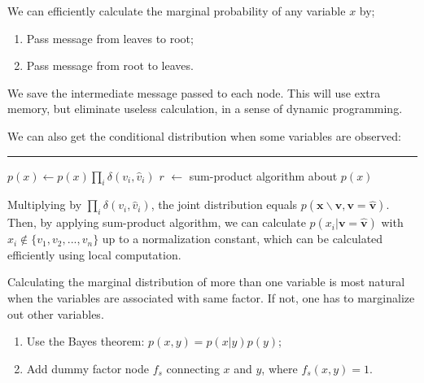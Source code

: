 \documentclass{article}
\begin{document}
        We can efficiently calculate the marginal probability of any variable $x$
        by;
        \begin{enumerate}
            \item Pass message from leaves to root;
            \item Pass message from root to leaves.
        \end{enumerate}
        We save the intermediate message passed to each node. This will use extra memory, but
        eliminate useless calculation, in a sense of dynamic programming.
        
        We can also get the conditional distribution when some variables are observed:
        
        \begin{algorithm}[H]
            \DontPrintSemicolon

            \caption{Modified sum-product algorithm for conditional distributions}


            \BlankLine
            \hrule

            $p(x) \leftarrow p(x)\prod_i \delta(v_i, \hat{v}_i)$\;
            $r$ $\leftarrow$ sum-product algorithm about $p(x)$\;

        \end{algorithm}

        Multiplying by $\prod_{i} \delta(v_i, \hat{v}_i)$, the joint distribution equals
        $p(\textbf{x} \backslash \textbf{v}, \textbf{v} = \hat{\textbf{v}})$.
        Then, by applying sum-product algorithm, we can calculate $p(x_i|\textbf{v}=\hat{\textbf{v}})$ with $x_i \notin \{v_1, v_2, ..., v_n\}$ up to a normalization constant,
        which can be calculated efficiently using local computation.
        
        Calculating the marginal distribution of more than one variable is most natural when the variables
        are associated with same factor. If not, one has to marginalize out other variables.
        \begin{enumerate}
            \item Use the Bayes theorem: $p(x, y)=p(x|y)p(y)$;
            \item Add dummy factor node $f_s$ connecting $x$ and $y$, where $f_s(x,y)=1$.
        \end{enumerate}
\end{document}
